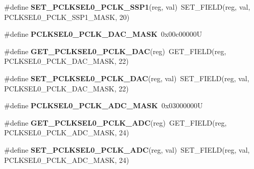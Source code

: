 \begin{DoxyCompactItemize}
\item 
\mbox{\label{group__lpc24xx__regs_gafd238eeb04e3c28d1a3d1db8b14bfcc9}} 
\#define {\bfseries S\+E\+T\+\_\+\+P\+C\+L\+K\+S\+E\+L0\+\_\+\+P\+C\+L\+K\+\_\+\+S\+S\+P1}(reg,  val)~S\+E\+T\+\_\+\+F\+I\+E\+LD(reg, val, P\+C\+L\+K\+S\+E\+L0\+\_\+\+P\+C\+L\+K\+\_\+\+S\+S\+P1\+\_\+\+M\+A\+SK, 20)
\item 
\mbox{\label{group__lpc24xx__regs_ga813e43110071fcc4ecfd61c8358da94e}} 
\#define {\bfseries P\+C\+L\+K\+S\+E\+L0\+\_\+\+P\+C\+L\+K\+\_\+\+D\+A\+C\+\_\+\+M\+A\+SK}~0x00c00000U
\item 
\mbox{\label{group__lpc24xx__regs_ga7db6898caaf20380b76b0b5c48fa2587}} 
\#define {\bfseries G\+E\+T\+\_\+\+P\+C\+L\+K\+S\+E\+L0\+\_\+\+P\+C\+L\+K\+\_\+\+D\+AC}(reg)~G\+E\+T\+\_\+\+F\+I\+E\+LD(reg, P\+C\+L\+K\+S\+E\+L0\+\_\+\+P\+C\+L\+K\+\_\+\+D\+A\+C\+\_\+\+M\+A\+SK, 22)
\item 
\mbox{\label{group__lpc24xx__regs_gabedead32c9f6f975957a818520c48e9c}} 
\#define {\bfseries S\+E\+T\+\_\+\+P\+C\+L\+K\+S\+E\+L0\+\_\+\+P\+C\+L\+K\+\_\+\+D\+AC}(reg,  val)~S\+E\+T\+\_\+\+F\+I\+E\+LD(reg, val, P\+C\+L\+K\+S\+E\+L0\+\_\+\+P\+C\+L\+K\+\_\+\+D\+A\+C\+\_\+\+M\+A\+SK, 22)
\item 
\mbox{\label{group__lpc24xx__regs_gabdfc1958cce4455adaf92fbbdf1d64be}} 
\#define {\bfseries P\+C\+L\+K\+S\+E\+L0\+\_\+\+P\+C\+L\+K\+\_\+\+A\+D\+C\+\_\+\+M\+A\+SK}~0x03000000U
\item 
\mbox{\label{group__lpc24xx__regs_ga00e3c2228dd91d944173587519f7767d}} 
\#define {\bfseries G\+E\+T\+\_\+\+P\+C\+L\+K\+S\+E\+L0\+\_\+\+P\+C\+L\+K\+\_\+\+A\+DC}(reg)~G\+E\+T\+\_\+\+F\+I\+E\+LD(reg, P\+C\+L\+K\+S\+E\+L0\+\_\+\+P\+C\+L\+K\+\_\+\+A\+D\+C\+\_\+\+M\+A\+SK, 24)
\item 
\mbox{\label{group__lpc24xx__regs_ga268020b28017d5b4472f5379b3bad93d}} 
\#define {\bfseries S\+E\+T\+\_\+\+P\+C\+L\+K\+S\+E\+L0\+\_\+\+P\+C\+L\+K\+\_\+\+A\+DC}(reg,  val)~S\+E\+T\+\_\+\+F\+I\+E\+LD(reg, val, P\+C\+L\+K\+S\+E\+L0\+\_\+\+P\+C\+L\+K\+\_\+\+A\+D\+C\+\_\+\+M\+A\+SK, 24)
\item 

\end{DoxyCompactItemize}
